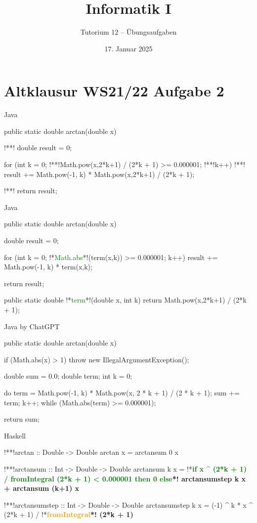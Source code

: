 \documentclass[aspectratio=169,usepdftitle=true,11pt,ngerman,t]{beamer}
\subtitle{Tutorium 12 -- Übungsaufgaben}
\date{17. Januar 2025}
\title{Informatik I}
\author{\lqfullname}
\begin{document}

\section{Altklausur WS21/22 Aufgabe 2}

\begin{frame}[fragile]{Java}\onslide<+->
    \begin{plainjava}
public static double arctan(double x) {
!*\onslide<+->*!    double result = 0;

    for (int k = 0; !*\onslide<+->*!Math.pow(x,2*k+1) / (2*k + 1) >= 0.000001; !*\onslide<+->*!k++) {
!*\onslide<+->*!	result += Math.pow(-1, k) * Math.pow(x,2*k+1) / (2*k + 1);
    }

!*\onslide<+->*!    return result;
}
    \end{plainjava}
\end{frame}

\begin{frame}{Java}
    \begin{plainjava}
public static double arctan(double x) {
    double result = 0;

    for (int k = 0; !*\textcolor{green}{Math.abs}*!(term(x,k)) >= 0.000001; k++) {
	    result += Math.pow(-1, k) * term(x,k);
    }

    return result;
}

public static double !*\textcolor{green}{term}*!(double x, int k) {
    return Math.pow(x,2*k+1) / (2*k + 1);
}
    \end{plainjava}
\end{frame}

\begin{frame}[fragile]{Java by ChatGPT}
    \begin{plainjava}
public static double arctan(double x) {
    if (Math.abs(x) > 1) throw new IllegalArgumentException();

    double sum = 0.0;
    double term;
    int k = 0;

    do {
        term = Math.pow(-1, k) * Math.pow(x, 2 * k + 1) / (2 * k + 1);
        sum += term;
        k++;
    } while (Math.abs(term) >= 0.000001);

    return sum;
}
    \end{plainjava}
\end{frame}

\begin{frame}[fragile]{Haskell}\onslide<+->
    \begin{plainhaskell}
!*\onslide<+->*!arctan :: Double -> Double
arctan x = arctansum 0 x

!*\onslide<+->*!arctansum :: Int -> Double -> Double
arctansum k x = !*\bfseries\textcolor{green}{if x \^{} (2*k + 1) / fromIntegral (2*k + 1) < 0.000001 then 0 else}*! arctansumstep k x + arctansum (k+1) x

!*\onslide<+->*!arctansumstep :: Int -> Double -> Double
arctansumstep k x = (-1) ^ k * x ^ (2*k + 1) / !*\bfseries\textcolor{orange}{fromIntegral}*! (2*k + 1)
    \end{plainhaskell}
\end{frame}
\end{document}
